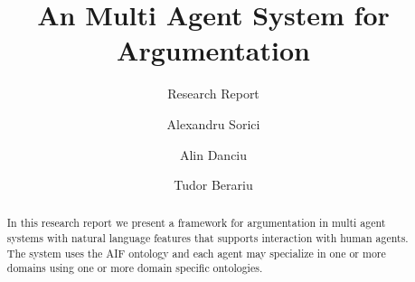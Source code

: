 \documentclass[lnbip]{svmultln}
\begin{document}
%
\mainmatter              %
%
\title{An Multi Agent System for Argumentation}
\subtitle{Research Report}
%
%
\author{Alexandru Sorici \and Alin Danciu \and Tudor Berariu}
%
%
%

\maketitle              %

\begin{abstract}        %
In this research report we present a framework for argumentation in multi agent systems with natural language features that supports interaction with human agents. The system uses the AIF ontology and each agent may specialize in one or more domains using one or more domain specific ontologies.
\end{abstract}
%



\end{document}
